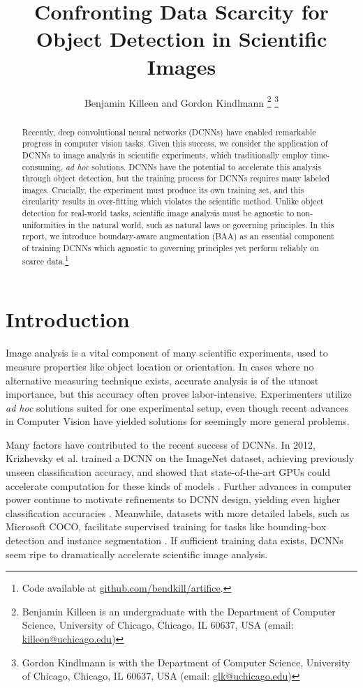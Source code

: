 \documentclass[10pt, draftcls]{IEEEtran}
\title{Confronting Data Scarcity for Object Detection in Scientific Images}
\author{Benjamin Killeen and Gordon Kindlmann %
  \thanks{Benjamin Killeen is an undergraduate with the Department of Computer
    Science, University of Chicago, Chicago, IL 60637, USA (email:
    \href{mailto:killeen@uchicago.edu}{killeen@uchicago.edu})} %
  \thanks{Gordon Kindlmann is with the Department of Computer Science, 
    University of Chicago, Chicago, IL 60637, USA (email:
    \href{mailto:glk@uchicago.edu}{glk@uchicago.edu})} %
}
\begin{document}
\maketitle

\begin{abstract}
  Recently, deep convolutional neural networks (DCNNs) have enabled remarkable
  progress in computer vision tasks. Given this success, we consider the
  application of DCNNs to image analysis in scientific experiments, which
  traditionally employ time-consuming, \emph{ad hoc} solutions. DCNNs have the
  potential to accelerate this analysis through object detection, but the
  training process for DCNNs requires many labeled images. Crucially, the
  experiment must produce its own training set, and this circularity results in
  over-fitting which violates the scientific method. Unlike object detection for
  real-world tasks, scientific image analysis must be agnostic to
  non-uniformities in the natural world, such as natural laws or governing
  principles. In this report, we introduce boundary-aware augmentation (BAA) as
  an essential component of training DCNNs which agnostic to governing
  principles yet perform reliably on scarce data.\footnote{Code available at
    \href{https://github.com/bendkill/artifice} {github.com/bendkill/artifice}.}
\end{abstract}

\section{Introduction}
\label{sec:introduction}


Image analysis is a vital component of many scientific experiments, used to
measure properties like object location or orientation. In cases where no
alternative measuring technique exists, accurate analysis is of the utmost
importance, but this accuracy often proves labor-intensive. Experimenters
utilize \emph{ad hoc} solutions suited for one experimental setup, even though
recent advances in Computer Vision have yielded solutions for seemingly more
general problems.

Many factors have contributed to the recent success of DCNNs. In 2012,
Krizhevsky et al. trained a DCNN on the ImageNet dataset, achieving previously
unseen classification accuracy, and showed that state-of-the-art GPUs could
accelerate computation for these kinds of models \cite{krizhevsky_imagenet_2012,
  deng_imagenet:_nodate}. Further advances in computer power continue to
motivate refinements to DCNN design, yielding even higher classification
accuracies \cite{simonyan_very_2014, szegedy_going_2014,
  he_deep_2015}. Meanwhile, datasets with more detailed labels, such as
Microsoft COCO, facilitate supervised training for tasks like bounding-box
detection and instance segmentation \cite{lin_microsoft_2014}. If sufficient
training data exists, DCNNs seem ripe to dramatically accelerate scientific
image analysis.
\end{document}
